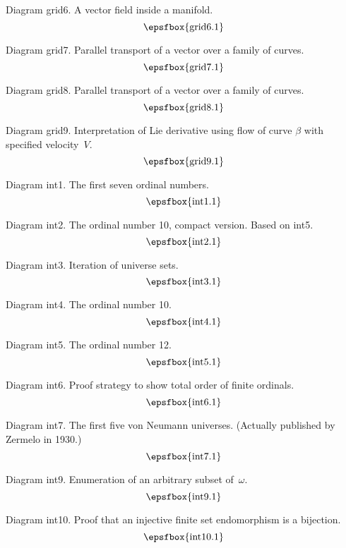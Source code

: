 Diagram grid6. A vector field inside a manifold.
$$
\centerline{\epsfbox{grid6.1}}
$$

Diagram grid7. Parallel transport of a vector over a family of curves.
$$
\centerline{\epsfbox{grid7.1}}
$$

\filleject

Diagram grid8. Parallel transport of a vector over a family of curves.
$$
\centerline{\epsfbox{grid8.1}}
$$

Diagram grid9. Interpretation of Lie derivative using flow of curve $\beta$ with
specified velocity~$V$.
$$
\centerline{\epsfbox{grid9.1}}
$$

\secteject
\edef\SECTint{\the\pageno}

Diagram int1. The first seven ordinal numbers.
$$
\centerline{\epsfbox{int1.1}}
$$

Diagram int2. The ordinal number 10, compact version. Based on int5.
$$
\centerline{\epsfbox{int2.1}}
$$

Diagram int3. Iteration of universe sets.
$$
\centerline{\epsfbox{int3.1}}
$$

\filleject

Diagram int4. The ordinal number 10.
$$
\centerline{\epsfbox{int4.1}}
$$

\filleject

Diagram int5. The ordinal number 12.
$$
\centerline{\epsfbox{int5.1}}
$$

\filleject

Diagram int6. Proof strategy to show total order of finite ordinals.
$$
\centerline{\epsfbox{int6.1}}
$$

Diagram int7. The first five von Neumann universes. (Actually published by
Zermelo in 1930.)
$$
\centerline{\epsfbox{int7.1}}
$$

Diagram int9. Enumeration of an arbitrary subset of~$\omega$.
$$
\centerline{\epsfbox{int9.1}}
$$

Diagram int10. Proof that an injective finite set endomorphism is a bijection.
$$
\centerline{\epsfbox{int10.1}}
$$

\filleject

